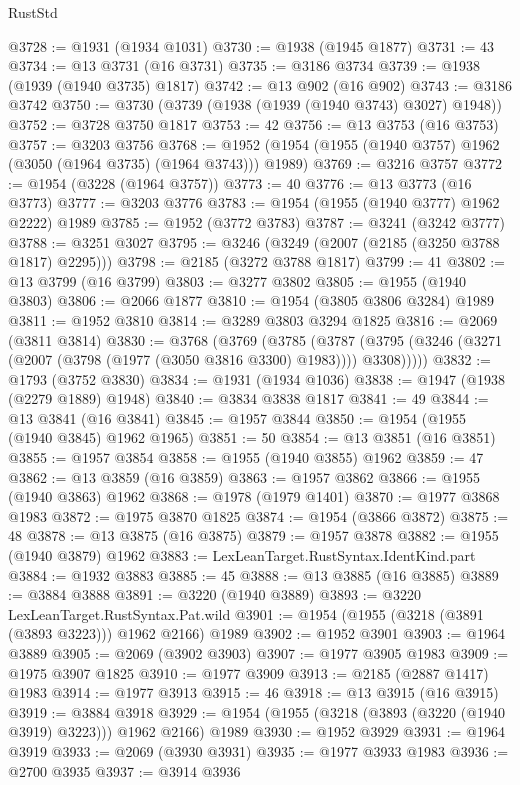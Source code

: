 \begin{lexlean}{RustStd}
\begin{coremodule}
@3728 := @1931 (@1934 @1031)
@3730 := @1938 (@1945 @1877)
@3731 := 43
@3734 := @13 @3731 (@16 @3731)
@3735 := @3186 @3734
@3739 := @1938 (@1939 (@1940 @3735) @1817)
@3742 := @13 @902 (@16 @902)
@3743 := @3186 @3742
@3750 := @3730 (@3739 (@1938 (@1939 (@1940 @3743) @3027) @1948))
@3752 := @3728 @3750 @1817
@3753 := 42
@3756 := @13 @3753 (@16 @3753)
@3757 := @3203 @3756
@3768 := @1952 (@1954 (@1955 (@1940 @3757) @1962 (@3050 (@1964 @3735) (@1964 @3743))) @1989)
@3769 := @3216 @3757
@3772 := @1954 (@3228 (@1964 @3757))
@3773 := 40
@3776 := @13 @3773 (@16 @3773)
@3777 := @3203 @3776
@3783 := @1954 (@1955 (@1940 @3777) @1962 @2222) @1989
@3785 := @1952 (@3772 @3783)
@3787 := @3241 (@3242 @3777)
@3788 := @3251 @3027
@3795 := @3246 (@3249 (@2007 (@2185 (@3250 @3788 @1817) @2295)))
@3798 := @2185 (@3272 @3788 @1817)
@3799 := 41
@3802 := @13 @3799 (@16 @3799)
@3803 := @3277 @3802
@3805 := @1955 (@1940 @3803)
@3806 := @2066 @1877
@3810 := @1954 (@3805 @3806 @3284) @1989
@3811 := @1952 @3810
@3814 := @3289 @3803 @3294 @1825
@3816 := @2069 (@3811 @3814)
@3830 := @3768
    (@3769
      (@3785
        (@3787 (@3795 (@3246 (@3271 (@2007 (@3798 (@1977 (@3050 @3816 @3300) @1983)))) @3308)))))
@3832 := @1793 (@3752 @3830)
@3834 := @1931 (@1934 @1036)
@3838 := @1947 (@1938 (@2279 @1889) @1948)
@3840 := @3834 @3838 @1817
@3841 := 49
@3844 := @13 @3841 (@16 @3841)
@3845 := @1957 @3844
@3850 := @1954 (@1955 (@1940 @3845) @1962 @1965)
@3851 := 50
@3854 := @13 @3851 (@16 @3851)
@3855 := @1957 @3854
@3858 := @1955 (@1940 @3855) @1962
@3859 := 47
@3862 := @13 @3859 (@16 @3859)
@3863 := @1957 @3862
@3866 := @1955 (@1940 @3863) @1962
@3868 := @1978 (@1979 @1401)
@3870 := @1977 @3868 @1983
@3872 := @1975 @3870 @1825
@3874 := @1954 (@3866 @3872)
@3875 := 48
@3878 := @13 @3875 (@16 @3875)
@3879 := @1957 @3878
@3882 := @1955 (@1940 @3879) @1962
@3883 := LexLeanTarget.RustSyntax.IdentKind.part
@3884 := @1932 @3883
@3885 := 45
@3888 := @13 @3885 (@16 @3885)
@3889 := @3884 @3888
@3891 := @3220 (@1940 @3889)
@3893 := @3220 LexLeanTarget.RustSyntax.Pat.wild
@3901 := @1954 (@1955 (@3218 (@3891 (@3893 @3223))) @1962 @2166) @1989
@3902 := @1952 @3901
@3903 := @1964 @3889
@3905 := @2069 (@3902 @3903)
@3907 := @1977 @3905 @1983
@3909 := @1975 @3907 @1825
@3910 := @1977 @3909
@3913 := @2185 (@2887 @1417) @1983
@3914 := @1977 @3913
@3915 := 46
@3918 := @13 @3915 (@16 @3915)
@3919 := @3884 @3918
@3929 := @1954 (@1955 (@3218 (@3893 (@3220 (@1940 @3919) @3223))) @1962 @2166) @1989
@3930 := @1952 @3929
@3931 := @1964 @3919
@3933 := @2069 (@3930 @3931)
@3935 := @1977 @3933 @1983
@3936 := @2700 @3935
@3937 := @3914 @3936

\end{coremodule}
\end{lexlean}
